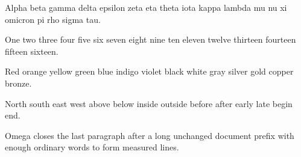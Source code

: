 
\hsize=220pt \vsize=240pt
Alpha beta gamma delta epsilon zeta eta theta iota kappa lambda mu nu xi omicron pi rho sigma tau.

One two three four five six seven eight nine ten eleven twelve thirteen fourteen fifteen sixteen.

Red orange yellow green blue indigo violet black white gray silver gold copper bronze.

North south east west above below inside outside before after early late begin end.

Omega closes the last paragraph after a long unchanged document prefix with enough ordinary words to form measured lines.
\bye
